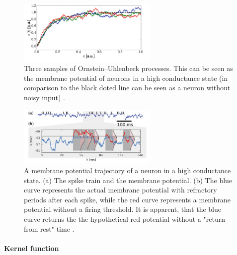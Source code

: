 \begin{figure}
	\centering
    	\includegraphics[width=0.6\textwidth]{imgs/orn_uhl_process.png} 
    \caption[Three samples of Ornstein–Uhlenbeck processes.]{Three samples of Ornstein–Uhlenbeck processes. This can be seen as the membrane potential of neurons in a high conductance state (in comparison to the black doted line can be seen as a neuron without noisy input) \cite{Petrovici2016}.}
	\label{fig:ornuhl}
\end{figure}


\begin{figure}
	\centering
    	\includegraphics[width=0.6\textwidth]{imgs/hcs.png} 
    \caption[A membrane potential trajectory of a neuron in a high conductance state.]{A membrane potential trajectory of a neuron in a high conductance state. (a) The spike train and the membrane potential. (b) The blue curve represents the actual membrane potential with refractory periods after each spike, while the red curve represents a membrane potential without a firing threshold. It is apparent, that the blue curve returns the the hypothetical red potential without a "return from rest" time  \cite{Petrovici2016}. }
	\label{fig:hcs}
\end{figure}


\paragraph{Kernel function} \label{c:pspkernel}


